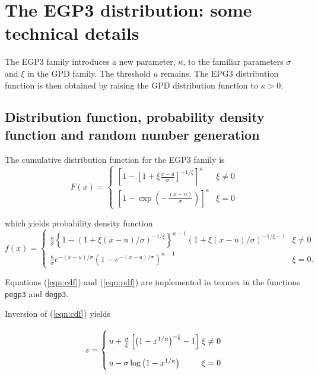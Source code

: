 \documentclass[a4paper]{article}\usepackage[]{graphicx}\usepackage[]{color}
\begin{document}
\clearpage
\section{\label{sec:egp3}The EGP3 distribution: some technical details}
The EGP3 family introduces a new parameter, $\kappa$, to the familiar
parameters $\sigma$ and $\xi$ in the GPD family. The threshold $u$ remains.
The EPG3 distribution function is then obtained by raising the GPD distribution
function to $\kappa > 0$.

\subsection{Distribution function, probability density function and random number generation}

The cumulative distribution function for the EGP3 family is
\begin{equation} \label{eqn:cdf}
F(x) = \begin{cases}
  \left[ 1 - \left[ 1 + \xi \frac{x - u}{\sigma} \right]^{-1/\xi}\right]^\kappa & \xi \ne 0 \\
  \left[ 1 - \exp\left(-\frac{(x-u)}{\sigma}\right)\right]^\kappa & \xi = 0
\end{cases}
\end{equation}

which yields probability density function
\begin{equation}\label{eqn:pdf}
f(x) = \begin{cases}
  \frac{\kappa}{\sigma}\left\{1 - (1 + \xi (x-u)/\sigma)^{-1/\xi}\right\}^{\kappa - 1}(1 + \xi (x-u)/\sigma)^{-1/\xi -1} & \xi \ne 0 \\
  \frac{\kappa}{\sigma}e^{-(x - u)/\sigma}\left(1 - e^{-(x-u)/\sigma}\right)^{\kappa - 1} & \xi = 0.
\end{cases}
\end{equation}

Equations (\ref{eqn:cdf}) and (\ref{eqn:pdf}) are implemented in texmex in the
functions {\tt pegp3} and {\tt degp3}.

Inversion of (\ref{eqn:cdf}) yields

\begin{eqnarray}
z = \left\{ \arraycolsep=1.4pt\def\arraystretch{2.2} %
    \begin{array}{ll}
    u + \frac{\sigma}{\xi}\left[\left(1 - x^{1/\kappa}\right)^{-\xi} - 1\right] & \xi \ne 0 \label{eqn:rgn}\\
    u - \sigma \log\left(1 - x^{1/\kappa}\right) & \xi = 0
    \end{array}
    \right.
\end{eqnarray}
\end{document}
